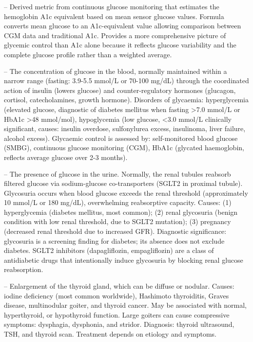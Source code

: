 -- Derived metric from continuous glucose monitoring that estimates the hemoglobin A1c equivalent based on mean sensor glucose values. Formula converts mean glucose to an A1c-equivalent value allowing comparison between CGM data and traditional A1c. Provides a more comprehensive picture of glycemic control than A1c alone because it reflects glucose variability and the complete glucose profile rather than a weighted average.

-- The concentration of glucose in the blood, normally maintained within a narrow range (fasting: 3.9-5.5 mmol/L or 70-100 mg/dL) through the coordinated action of insulin (lowers glucose) and counter-regulatory hormones (glucagon, cortisol, catecholamines, growth hormone). Disorders of glycaemia: hyperglycemia (elevated glucose, diagnostic of diabetes mellitus when fasting >7.0 mmol/L or HbA1c >48 mmol/mol), hypoglycemia (low glucose, <3.0 mmol/L clinically significant, causes: insulin overdose, sulfonylurea excess, insulinoma, liver failure, alcohol excess). Glycaemic control is assessed by: self-monitored blood glucose (SMBG), continuous glucose monitoring (CGM), HbA1c (glycated haemoglobin, reflects average glucose over 2-3 months).

-- The presence of glucose in the urine. Normally, the renal tubules reabsorb filtered glucose via sodium-glucose co-transporters (SGLT2 in proximal tubule). Glycosuria occurs when blood glucose exceeds the renal threshold (approximately 10 mmol/L or 180 mg/dL), overwhelming reabsorptive capacity. Causes: (1) hyperglycemia (diabetes mellitus, most common); (2) renal glycosuria (benign condition with low renal threshold, due to SGLT2 mutation); (3) pregnancy (decreased renal threshold due to increased GFR). Diagnostic significance: glycosuria is a screening finding for diabetes; its absence does not exclude diabetes. SGLT2 inhibitors (dapagliflozin, empagliflozin) are a class of antidiabetic drugs that intentionally induce glycosuria by blocking renal glucose reabsorption.

-- Enlargement of the thyroid gland, which can be diffuse or nodular. Causes: iodine deficiency (most common worldwide), Hashimoto thyroiditis, Graves disease, multinodular goiter, and thyroid cancer. May be associated with normal, hyperthyroid, or hypothyroid function. Large goiters can cause compressive symptoms: dysphagia, dysphonia, and stridor. Diagnosis: thyroid ultrasound, TSH, and thyroid scan. Treatment depends on etiology and symptoms.

